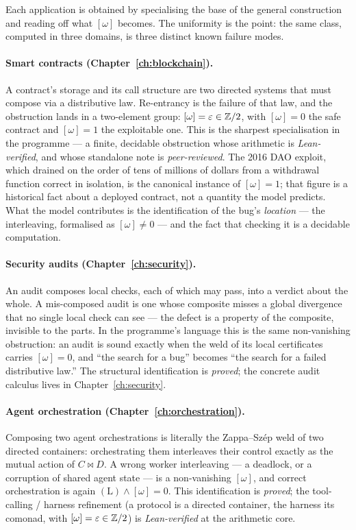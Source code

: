 Each application is obtained by specialising the base of the general construction and
reading off what $[\omega]$ becomes. The uniformity is the point: the same class, computed
in three domains, is three distinct known failure modes.

\paragraph{Smart contracts (Chapter~\ref{ch:blockchain}).}
A contract's storage and its call structure are two directed systems that must compose via
a distributive law. Re-entrancy is the failure of that law, and the obstruction lands in a
two-element group: $[\omega]=\varepsilon\in\mathbb{Z}/2$, with $[\omega]=0$ the safe contract and
$[\omega]=1$ the exploitable one. This is the sharpest specialisation in the programme ---
a finite, decidable obstruction whose arithmetic is \emph{Lean-verified}, and whose
standalone note is \emph{peer-reviewed}. The 2016 DAO exploit, which drained on the order
of tens of millions of dollars from a withdrawal function correct in isolation, is the
canonical instance of $[\omega]=1$; that figure is a historical fact about a deployed
contract, not a quantity the model predicts. What the model contributes is the
identification of the bug's \emph{location} --- the interleaving, formalised as
$[\omega]\neq0$ --- and the fact that checking it is a decidable computation.

\paragraph{Security audits (Chapter~\ref{ch:security}).}
An audit composes local checks, each of which may pass, into a verdict about the whole. A
mis-composed audit is one whose composite misses a global divergence that no single local
check can see --- the defect is a property of the composite, invisible to the parts. In the
programme's language this is the same non-vanishing obstruction: an audit is sound exactly
when the weld of its local certificates carries $[\omega]=0$, and ``the search for a bug''
becomes ``the search for a failed distributive law.'' The structural identification is
\emph{proved}; the concrete audit calculus lives in Chapter~\ref{ch:security}.

\paragraph{Agent orchestration (Chapter~\ref{ch:orchestration}).}
Composing two agent orchestrations is literally the Zappa--Sz\'ep weld of two directed
containers: orchestrating them interleaves their control exactly as the mutual action of
$C\bowtie D$. A wrong worker interleaving --- a deadlock, or a corruption of shared agent
state --- is a non-vanishing $[\omega]$, and correct orchestration is again
$(\mathrm{L})\wedge[\omega]=0$. This identification is \emph{proved}; the tool-calling /
harness refinement (a protocol is a directed container, the harness its comonad, with
$[\omega]=\varepsilon\in\mathbb{Z}/2$) is \emph{Lean-verified} at the arithmetic core.

